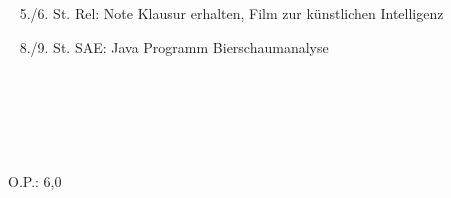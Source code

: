{{	\textbullet~ 5./6. St. Rel: Note Klausur erhalten, Film zur künstlichen Intelligenz\par
	\textbullet~ 8./9. St. SAE: Java Programm Bierschaumanalyse\par
	\textbullet~ \par
	\textbullet~ \par
	\textbullet~ 
	}{}{O.P.: 6,0}
}{}
\Unterschrift
\newpage
